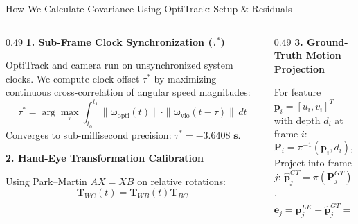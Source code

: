 \documentclass[aspectratio=169, 10pt]{beamer}
\begin{document}
\begin{frame}{How We Calculate Covariance Using OptiTrack: Setup \& Residuals}
  \begin{columns}[T]
    \begin{column}{0.49\textwidth}
      {\small \textbf{\textcolor{NavyBlue}{1. Sub-Frame Clock Synchronization ($\tau^*$)}}}
      \vspace{0.1cm}

      OptiTrack and camera run on unsynchronized system clocks. We compute clock offset $\tau^*$ by maximizing continuous cross-correlation of angular speed magnitudes:
      \begin{equation}
        \tau^* = \arg\max_\tau \int_{t_0}^{t_1} \|\boldsymbol{\omega}_{\text{opti}}(t)\| \cdot \|\boldsymbol{\omega}_{\text{vio}}(t - \tau)\| \, dt
      \end{equation}
      Converges to sub-millisecond precision: $\tau^* = \mathbf{-3.6408\text{ s}}$.

      \vspace{0.2cm}
      {\small \textbf{\textcolor{NavyBlue}{2. Hand-Eye Transformation Calibration}}}
      \vspace{0.1cm}

      Using Park--Martin $AX = XB$ on relative rotations:
      \begin{equation}
        \mathbf{T}_{WC}(t) = \mathbf{T}_{WB}(t) \mathbf{T}_{BC}
      \end{equation}
    \end{column}

    \begin{column}{0.49\textwidth}
      {\small \textbf{\textcolor{NavyBlue}{3. Ground-Truth Motion Projection}}}
      \vspace{0.1cm}

      For feature $\mathbf{p}_i = [u_i, v_i]^T$ with depth $d_i$ at frame $i$:
      \begin{equation}
        \mathbf{P}_i = \pi^{-1}(\mathbf{p}_i, d_i), \quad \mathbf{P}_j^{GT} = \mathbf{T}_{C_j C_i}^{GT} \mathbf{P}_i
      \end{equation}
      Project into frame $j$: $\hat{\mathbf{p}}_j^{GT} = \pi(\mathbf{P}_j^{GT})$.
      \begin{equation}
        \mathbf{e}_j = \mathbf{p}_j^{LK} - \hat{\mathbf{p}}_j^{GT} = \begin{bmatrix} e_u \\ e_v \end{bmatrix}
      \end{equation}
      \vspace{0.05cm}


\end{column}
\end{columns}
\end{frame}
\end{document}

